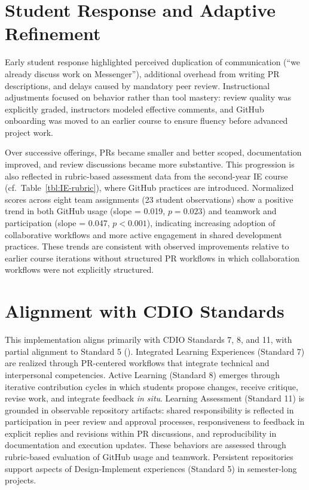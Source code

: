 \section{Student Response and Adaptive Refinement}

Early student response highlighted perceived duplication of communication (``we already discuss work on Messenger''), additional overhead from writing PR descriptions, and delays caused by mandatory peer review. Instructional adjustments focused on behavior rather than tool mastery: review quality was explicitly graded, instructors modeled effective comments, and GitHub onboarding was moved to an earlier course to ensure fluency before advanced project work.

Over successive offerings, PRs became smaller and better scoped, documentation improved, and review discussions became more substantive. This progression is also reflected in rubric-based assessment data from the second-year IE course (cf.~Table~\ref{tbl:IE-rubric}), where GitHub practices are introduced. Normalized scores across eight team assignments (23 student observations) show a positive trend in both GitHub usage (slope = 0.019, $p = 0.023$) and teamwork and participation (slope = 0.047, $p < 0.001$), indicating increasing adoption of collaborative workflows and more active engagement in shared development practices.
These trends are consistent with observed improvements relative to earlier course iterations without structured PR workflows in which collaboration workflows were not explicitly structured.



\section{Alignment with CDIO Standards}
This implementation aligns primarily with CDIO Standards 7, 8, and 11, with partial alignment to Standard 5 (\cite{malmqvist2020standards3}). 
Integrated Learning Experiences (Standard 7) are realized through PR-centered workflows that integrate technical and interpersonal competencies. Active Learning (Standard 8) emerges through iterative contribution cycles in which students propose changes, receive critique, revise work, and integrate feedback \emph{in situ}. 
Learning Assessment (Standard 11) is grounded in observable repository artifacts: shared responsibility is reflected in participation in peer review and approval processes, responsiveness to feedback in explicit replies and revisions within PR discussions, and reproducibility in documentation and execution updates. These behaviors are assessed through rubric-based evaluation of GitHub usage and teamwork.
Persistent repositories support aspects of Design-Implement experiences (Standard 5) in semester-long projects.



